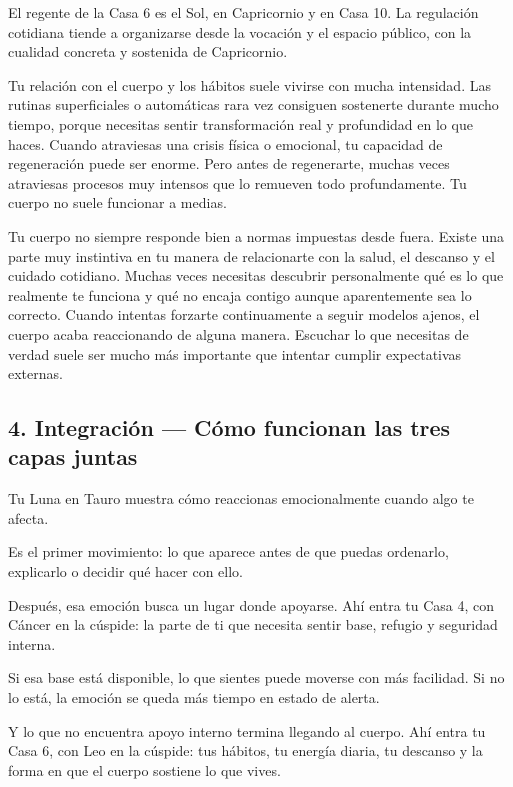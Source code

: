 \documentclass[11pt,a4paper]{article}
\begin{document}
El regente de la Casa 6 es el Sol, en Capricornio y en Casa 10. La regulación cotidiana tiende a organizarse desde la vocación y el espacio público, con la cualidad concreta y sostenida de Capricornio.

Tu relación con el cuerpo y los hábitos suele vivirse con mucha intensidad. Las rutinas superficiales o automáticas rara vez consiguen sostenerte durante mucho tiempo, porque necesitas sentir transformación real y profundidad en lo que haces. Cuando atraviesas una crisis física o emocional, tu capacidad de regeneración puede ser enorme. Pero antes de regenerarte, muchas veces atraviesas procesos muy intensos que lo remueven todo profundamente. Tu cuerpo no suele funcionar a medias.

Tu cuerpo no siempre responde bien a normas impuestas desde fuera. Existe una parte muy instintiva en tu manera de relacionarte con la salud, el descanso y el cuidado cotidiano. Muchas veces necesitas descubrir personalmente qué es lo que realmente te funciona y qué no encaja contigo aunque aparentemente sea lo correcto. Cuando intentas forzarte continuamente a seguir modelos ajenos, el cuerpo acaba reaccionando de alguna manera. Escuchar lo que necesitas de verdad suele ser mucho más importante que intentar cumplir expectativas externas.

\vspace{0.8cm}

\subsection{4. Integración — Cómo funcionan las tres capas juntas}

Tu Luna en Tauro muestra cómo reaccionas emocionalmente cuando algo te afecta.

Es el primer movimiento: lo que aparece antes de que puedas ordenarlo, explicarlo o decidir qué hacer con ello.

Después, esa emoción busca un lugar donde apoyarse. Ahí entra tu Casa 4, con Cáncer en la cúspide: la parte de ti que necesita sentir base, refugio y seguridad interna.

Si esa base está disponible, lo que sientes puede moverse con más facilidad.
Si no lo está, la emoción se queda más tiempo en estado de alerta.

Y lo que no encuentra apoyo interno termina llegando al cuerpo. Ahí entra tu Casa 6, con Leo en la cúspide: tus hábitos, tu energía diaria, tu descanso y la forma en que el cuerpo sostiene lo que vives.
\end{document}
